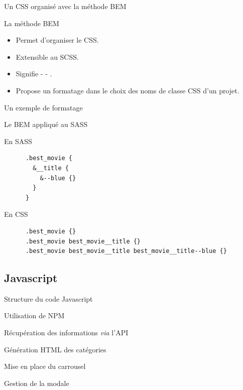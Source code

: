 \begin{frame}[fragile]{Un CSS organisé avec la méthode BEM}
  
  \begin{block}{La méthode BEM}
    \begin{itemize}
    \item Permet d'organiser le CSS.
    \item Extensible au SCSS.
    \item Signifie {} - {} - {}.
    \item Propose un formatage dans le choix des noms de classe CSS d'un projet.
    \end{itemize}    
  \end{block}

  \begin{block}{Un exemple de formatage}
    \textsc{\color{red}{nom\_bloc} \color{violet}{\_ \_ nom\_element} \color{teal}{- - nom\_modifier}}
  \end{block}
\end{frame}

\begin{frame}[fragile]{Le BEM appliqué au SASS}
  \begin{block}{En SASS}
    \scriptsize
    \begin{verbatim}
      .best_movie {
        &__title {
          &--blue {}
        }
      }
    \end{verbatim}
  \end{block}

  \begin{block}{En CSS}
    \scriptsize
    \begin{verbatim}
      .best_movie {}
      .best_movie best_movie__title {}
      .best_movie best_movie__title best_movie__title--blue {}
    \end{verbatim}
  \end{block}
\end{frame}

\subsection{Javascript}
\begin{frame}{Structure du code Javascript}
\end{frame}

\begin{frame}{Utilisation de NPM}
\end{frame}

\begin{frame}{Récupération des informations \textit{via} l'API}
\end{frame}

\begin{frame}{Génération HTML des catégories}
\end{frame}

\begin{frame}{Mise en place du carrousel}
\end{frame}

\begin{frame}{Gestion de la modale}
\end{frame}
